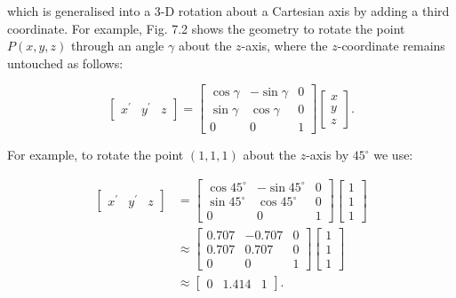 \documentclass[10pt]{article}
\begin{document}
which is generalised into a 3-D rotation about a Cartesian axis by adding a third coordinate. For example, Fig. 7.2 shows the geometry to rotate the point $P(x, y, z)$ through an angle $\gamma$ about the $z$-axis, where the $z$-coordinate remains untouched as follows:

$$
\left[\begin{array}{lll}
x^{\prime} & y^{\prime} & z
\end{array}\right]=\left[\begin{array}{ccc}
\cos \gamma & -\sin \gamma & 0 \\
\sin \gamma & \cos \gamma & 0 \\
0 & 0 & 1
\end{array}\right]\left[\begin{array}{l}
x \\
y \\
z
\end{array}\right] .
$$

For example, to rotate the point $(1,1,1)$ about the $z$-axis by $45^{\circ}$ we use:

$$
\begin{aligned}
{\left[\begin{array}{lll}
x^{\prime} & y^{\prime} & z
\end{array}\right] } & =\left[\begin{array}{ccc}
\cos 45^{\circ} & -\sin 45^{\circ} & 0 \\
\sin 45^{\circ} & \cos 45^{\circ} & 0 \\
0 & 0 & 1
\end{array}\right]\left[\begin{array}{l}
1 \\
1 \\
1
\end{array}\right] \\
& \approx\left[\begin{array}{ccc}
0.707 & -0.707 & 0 \\
0.707 & 0.707 & 0 \\
0 & 0 & 1
\end{array}\right]\left[\begin{array}{l}
1 \\
1 \\
1
\end{array}\right] \\
& \approx\left[\begin{array}{llll}
0 & 1.414 & 1
\end{array}\right] .
\end{aligned}
$$
\end{document}
